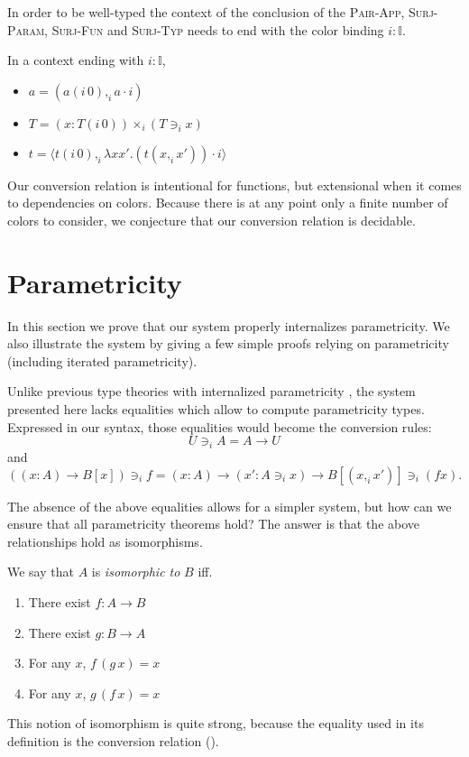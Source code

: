 \documentclass[english]{PaperTools/latex/lipics}
\newcommand\CP[3]{(#2,_{#1} #3)}
\newcommand\CTimes[2]{(#2) ×_{#1}}
\newcommand\param[1]{\!\cdot\!#1}
\newcommand\op[1]{∋_{#1}}
\newcommand\fp[3]{⟨#2 ,_{#1} #3⟩}
\newcommand\mor[2]{({#1}\,{#2})}
\newcommand\proj[2]{{#2}\mor{#1}0}
\begin{document}
\begin{remark}
  In order to be well-typed the context of the conclusion of the
  \textsc{Pair-App}, \textsc{Surj-Param}, \textsc{Surj-Fun} and
  \textsc{Surj-Typ} needs to end with the color binding $i : 𝕀$.
\end{remark}

\begin{corollary}
  \label{cor:equalities}
  In a context ending with $i : 𝕀$,
  \begin{itemize}
  \item $a = \CP i {\proj i a} {a \param i}$
  \item $T = \CTimes i {x:\proj i T} {(T \op i x)}$
  \item $t = \fp i {\proj i t} {λx x'. (t \CP i x {x'}) \param i}$
  \end{itemize}
\end{corollary}

Our conversion relation is intentional for functions, but extensional
when it comes to dependencies on colors. Because there is at any point
only a finite number of colors to consider, we conjecture that our
conversion relation is decidable.

\section{Parametricity}
\label{sec:parametricity}
In this section we prove that our system properly internalizes
parametricity. We also illustrate the system by giving a few simple
proofs relying on parametricity (including iterated parametricity).

Unlike previous type theories with internalized parametricity
\citep{bernardy_computational_2012, bernardy_type-theory_2013}, the
system presented here lacks equalities which allow to compute
parametricity types. Expressed in our syntax, those equalities would become the conversion rules:
$$U \op i A = A → U$$
and
$$((x:A) → B[x]) \op i f = (x:A) → (x' : A \op i x) → B[\CP i x {x'}] \op i (f x).$$

The absence of the above equalities allows for a simpler system, but
how can we ensure that all parametricity theorems hold?  The answer is
that the above relationships hold as isomorphisms.

We say that $A$ is \emph{isomorphic to} $B$ iff.
\begin{enumerate}
  \item There exist $f : A → B$
  \item There exist $g : B → A$
  \item For any $x$, $f\, (g\, x) = x$
  \item For any $x$, $g\, (f\, x) = x$
\end{enumerate}
This notion of isomorphism is quite strong, because the equality used
in its definition is the conversion relation ().
\end{document}
